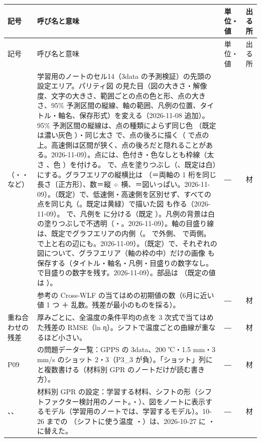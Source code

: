 \documentclass[paper=a4paper,fontsize=10.5pt,line_length=44zw,number_of_lines=38]{jlreq}
\makeatletter
\newcommand{\file}[1]{\texttt{\detokenize{#1}}}
\newenvironment{symtab}{%
  \begin{longtable}{@{}>{\raggedright\arraybackslash}p{6.5\zw}>{\raggedright\arraybackslash}p{22\zw}>{\raggedright\arraybackslash}p{6\zw}>{\raggedright\arraybackslash}p{4.5\zw}@{}}
  \toprule 記号 & 呼び名と意味 & 単位・値 & 出る所 \\ \midrule \endfirsthead
  \toprule 記号 & 呼び名と意味 & 単位・値 & 出る所 \\ \midrule \endhead
  \bottomrule \endlastfoot}{\end{longtable}}
\makeatother
\begin{document}
\begin{symtab}
\file{VALID_…}（\file{VALID_FIGSIZE}・\file{VALID_POINT_COLOR}・\file{VALID_LEGEND_SEPARATE} など） & 学習用のノートのセル14（3data の予測検証）の先頭の設定エリア。パリティ図 \file{予測検証_3data_パリティ.png} の見た目（図の大きさ・解像度、文字の大きさ、範囲ごとの点の色と形、点の大きさ、95\% 予測区間の縦線、軸の範囲、凡例の位置、タイトル・軸名、保存形式）を変える（2026-11-08 追加）。95\% 予測区間の縦線は、点の種類によらず同じ色 \file{VALID_ERR_COLOR}（既定は濃い灰色 \file{0.3}）・同じ太さ \file{VALID_ERR_LINE} で、点の後ろに描く（\file{VALID_ERR_ON_TOP = True} で点の上。高速側は区間が狭く、点の後ろだと隠れることがある。2026-11-09）。点には、色付き・色なしとも枠線（太さ \file{VALID_POINT_EDGE}、色 \file{VALID_POINT_EDGE_COLOR}）を付ける。\file{VALID_POINT_COLOR = False} で、点を塗りつぶし（\file{VALID_POINT_FILL}、既定は白）にする。グラフエリアの縦横比は \file{VALID_ASPECT}（\file{"equal"}＝両軸の 1 桁を同じ長さ〔正方形〕、数＝縦 $\div$ 横、\file{None}＝図いっぱい。2026-11-09）。\file{VALID_SAME_SHAPE = True}（既定）で、低速側・高速側を区別せず、すべての点を同じ丸（\file{VALID_SAME_STYLE}。既定は黄緑）で描いた図 \file{予測検証_3data_パリティ_同じ形.png} も作る（2026-11-09）。\file{VALID_LEGEND_SEPARATE = True} で、凡例を \file{…_凡例.png} に分ける（既定 \file{False}）。凡例の背景は白の塗りつぶしで不透明（\file{VALID_LEGEND_FACE}・\file{VALID_LEGEND_ALPHA}。2026-11-09）。軸の目盛り線は、既定でグラフエリアの内側（\file{VALID_TICK_DIR = "in"}。\file{"out"} で外側、\file{"inout"} で両側。\file{VALID_TICK_MIRROR = True} で上と右の辺にも。2026-11-09）。\file{VALID_AREA_ONLY = True}（既定）で、それぞれの図について、グラフエリア（軸の枠の中）だけの画像 \file{…_グラフエリアのみ.png} も保存する（タイトル・軸名・凡例・目盛りの数字なし。\file{VALID_AREA_TICK_LABELS = True} で目盛りの数字を残す。2026-11-09）。部品は \file{mat_common.parity_plot}（既定の値は \file{PARITY_DEFAULT}）。 & ― & 材 \\
\file{CWLF_STARTS} & 参考の Cross-WLF の当てはめの初期値の数（6月に近い値 1 つ ＋ 乱数。残差が最小のものを採る）。 & ― & 材 \\
重ね合わせの残差 & 厚みごとに、全温度の条件平均の点を 3 次式で当てはめた残差の RMSE（ln η）。シフトで温度ごとの曲線が重なるほど小さい。 & ― & 材 \\
P09 & 05 の問題データ一覧：GPPS の 3data、200 ℃・1.5 mm・3 mm/s のショット 2・3（P3\_3 が負）。「ショット」列に \file{2;3} と複数書ける（材料別 GPR のノートだけが読む書き方）。 & ― & 材 \\
\file{MATERIALS}、\file{STRUCTS}、\file{MAIN_KEY} & 材料別 GPR の設定：学習する材料、シフトの形（シフトファクター検討用のノート。\file{"B"}・\file{"A"}）、図をノートに表示するモデル（学習用のノートでは、学習するモデル）。10-26 までの \file{SHIFT_TEMPS}（シフトに使う温度 \file{"Tset"}・\file{"Tff"}）は、2026-10-27 に \file{SHIFT_COL}・\file{SHIFT_COLS} に替えた。 & ― & 材 \\

\end{symtab}
\end{document}
